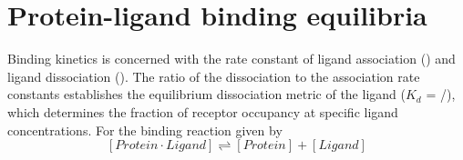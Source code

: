 
\section{Protein-ligand binding equilibria}





Binding kinetics is concerned with the rate constant of ligand association (\kon) and ligand dissociation (\koff). The ratio of the dissociation to the association rate constants establishes the equilibrium dissociation metric of the ligand ($K_{d}$ = \koff/\kon), which determines the fraction of receptor occupancy at specific ligand concentrations. For the binding reaction given by
\begin{equation}
\left[ Protein\cdot Ligand \right] \rightleftharpoons \left[ Protein \right]+\left[ Ligand \right]
\end{equation}
 
